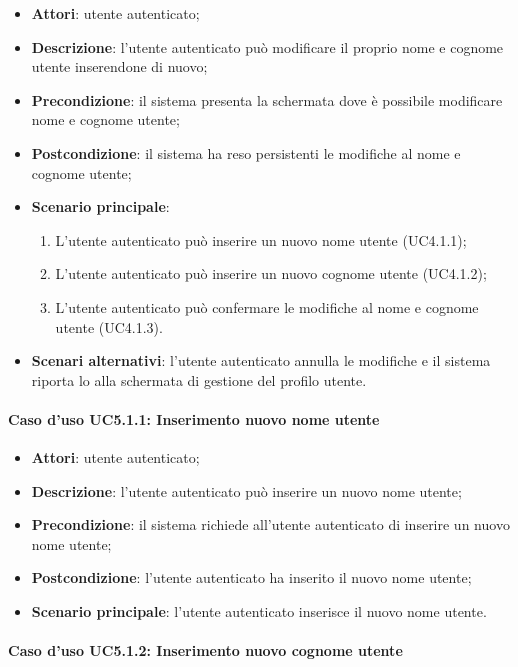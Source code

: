 \begin{itemize}
	\item \textbf{Attori}: utente autenticato;
	\item \textbf{Descrizione}: l'utente autenticato può modificare il proprio nome e cognome utente inserendone di nuovo;
	\item \textbf{Precondizione}: il sistema presenta la schermata dove è possibile modificare nome e cognome utente;
	\item \textbf{Postcondizione}: il sistema ha reso persistenti le modifiche al nome e cognome utente;
	\item \textbf{Scenario principale}:
		\begin{enumerate}
			\item L'utente autenticato può inserire un nuovo nome utente (UC4.1.1);
			\item L'utente autenticato può inserire un nuovo cognome utente (UC4.1.2);
			\item L'utente autenticato può confermare le modifiche al nome e cognome utente (UC4.1.3).
		\end{enumerate}
	\item \textbf{Scenari alternativi}: l'utente autenticato annulla le modifiche e il sistema riporta lo alla schermata di gestione del profilo utente.
\end{itemize}

\paragraph{Caso d'uso UC5.1.1: Inserimento nuovo nome utente}

\begin{itemize}
	\item \textbf{Attori}: utente autenticato;
	\item \textbf{Descrizione}: l'utente autenticato può inserire un nuovo nome utente;
	\item \textbf{Precondizione}: il sistema richiede all'utente autenticato di inserire un nuovo nome utente;
	\item \textbf{Postcondizione}: l'utente autenticato ha inserito il nuovo nome utente;
	\item \textbf{Scenario principale}: l'utente autenticato inserisce il nuovo nome utente.
\end{itemize}

\paragraph{Caso d'uso UC5.1.2: Inserimento nuovo cognome utente}

